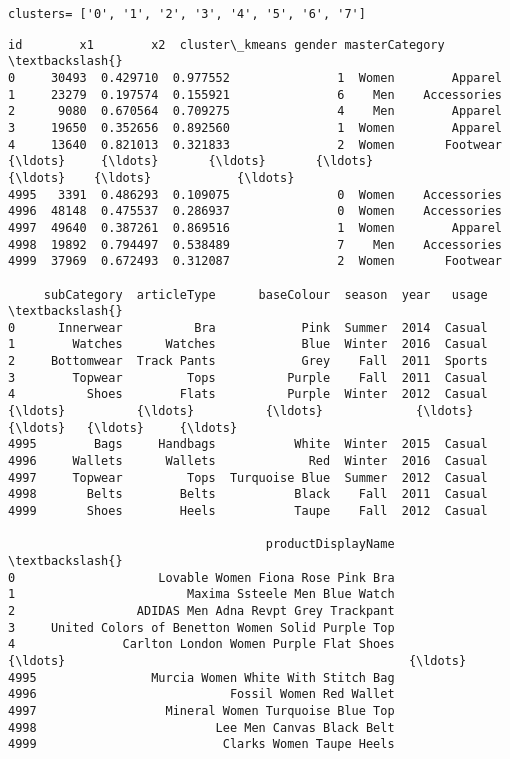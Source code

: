 \documentclass[11pt]{article}
\makeatletter
\newcommand{\boxspacing}{\kern\kvtcb@left@rule\kern\kvtcb@boxsep}
\newcommand{\prompt}[4]{
        {\ttfamily\llap{{\color{#2}[#3]:\hspace{3pt}#4}}\vspace{-\baselineskip}}
    }
\makeatother
\begin{document}
    \begin{Verbatim}[commandchars=\\\{\}]
clusters= ['0', '1', '2', '3', '4', '5', '6', '7']
    \end{Verbatim}

            \begin{tcolorbox}[breakable, size=fbox, boxrule=.5pt, pad at break*=1mm, opacityfill=0]
\prompt{Out}{outcolor}{152}{\boxspacing}
\begin{Verbatim}[commandchars=\\\{\}]
         id        x1        x2  cluster\_kmeans gender masterCategory  \textbackslash{}
0     30493  0.429710  0.977552               1  Women        Apparel
1     23279  0.197574  0.155921               6    Men    Accessories
2      9080  0.670564  0.709275               4    Men        Apparel
3     19650  0.352656  0.892560               1  Women        Apparel
4     13640  0.821013  0.321833               2  Women       Footwear
{\ldots}     {\ldots}       {\ldots}       {\ldots}             {\ldots}    {\ldots}            {\ldots}
4995   3391  0.486293  0.109075               0  Women    Accessories
4996  48148  0.475537  0.286937               0  Women    Accessories
4997  49640  0.387261  0.869516               1  Women        Apparel
4998  19892  0.794497  0.538489               7    Men    Accessories
4999  37969  0.672493  0.312087               2  Women       Footwear

     subCategory  articleType      baseColour  season  year   usage  \textbackslash{}
0      Innerwear          Bra            Pink  Summer  2014  Casual
1        Watches      Watches            Blue  Winter  2016  Casual
2     Bottomwear  Track Pants            Grey    Fall  2011  Sports
3        Topwear         Tops          Purple    Fall  2011  Casual
4          Shoes        Flats          Purple  Winter  2012  Casual
{\ldots}          {\ldots}          {\ldots}             {\ldots}     {\ldots}   {\ldots}     {\ldots}
4995        Bags     Handbags           White  Winter  2015  Casual
4996     Wallets      Wallets             Red  Winter  2016  Casual
4997     Topwear         Tops  Turquoise Blue  Summer  2012  Casual
4998       Belts        Belts           Black    Fall  2011  Casual
4999       Shoes        Heels           Taupe    Fall  2012  Casual

                                    productDisplayName  \textbackslash{}
0                    Lovable Women Fiona Rose Pink Bra
1                        Maxima Ssteele Men Blue Watch
2                 ADIDAS Men Adna Revpt Grey Trackpant
3     United Colors of Benetton Women Solid Purple Top
4               Carlton London Women Purple Flat Shoes
{\ldots}                                                {\ldots}
4995                Murcia Women White With Stitch Bag
4996                           Fossil Women Red Wallet
4997                  Mineral Women Turquoise Blue Top
4998                         Lee Men Canvas Black Belt
4999                          Clarks Women Taupe Heels


\end{Verbatim}
\end{tcolorbox}
\end{document}
